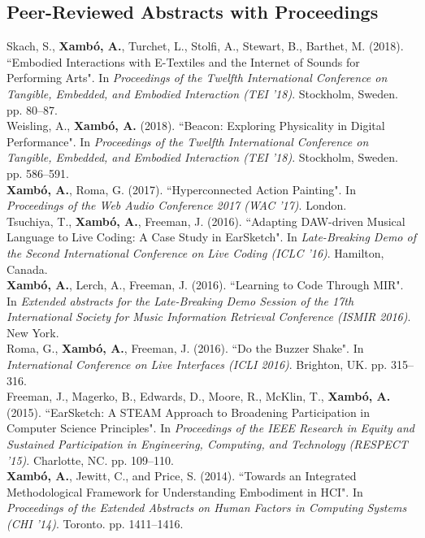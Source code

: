 \documentclass[10pt, a4paper]{article}
\newcommand{\years}[1]{\marginnote{\scriptsize #1}}
\begin{document}
\subsection*{Peer-Reviewed Abstracts with Proceedings}
\noindent
\years{2018b}Skach, S., \textbf{Xambó, A.}, Turchet, L., Stolfi, A., Stewart, B., Barthet, M. (2018). “Embodied Interactions with E-Textiles and the Internet of Sounds for Performing Arts". In \emph{Proceedings of the Twelfth International Conference on Tangible, Embedded, and Embodied Interaction (TEI '18)}. Stockholm, Sweden. pp. 80--87.\\
\years{2018a}Weisling, A., \textbf{Xambó, A.} (2018). “Beacon: Exploring Physicality in Digital Performance". In \emph{Proceedings of the Twelfth International Conference on Tangible, Embedded, and Embodied Interaction (TEI '18)}. Stockholm, Sweden. pp. 586--591.\\
\years{2017a}\textbf{Xambó, A.}, Roma, G. (2017). “Hyperconnected Action Painting". In \emph{Proceedings of the Web Audio Conference 2017 (WAC '17)}. London.\\
\years{2016c}Tsuchiya, T., \textbf{Xambó, A.}, Freeman, J. (2016). “Adapting DAW-driven Musical Language to Live Coding: A Case Study in EarSketch". In \emph{Late-Breaking Demo of the Second International Conference on Live Coding (ICLC '16)}. Hamilton, Canada.\\ 
\years{2016b}\textbf{Xambó, A.}, Lerch, A., Freeman, J. (2016). “Learning to Code Through MIR". In \emph{Extended abstracts for the Late-Breaking Demo Session of the 17th International Society for Music Information Retrieval Conference (ISMIR 2016)}. New York.\\
\years{2016a}Roma, G., \textbf{Xambó, A.}, Freeman, J. (2016). “Do the Buzzer Shake". In \emph{International Conference on Live Interfaces (ICLI 2016)}. Brighton, UK. pp. 315--316.\\
\years{2015}Freeman, J., Magerko, B., Edwards, D., Moore, R., McKlin, T., \textbf{Xambó, A.} (2015). “EarSketch: A STEAM Approach to Broadening Participation in Computer Science Principles". In \emph{Proceedings of the IEEE Research in Equity and Sustained Participation in Engineering, Computing, and Technology (RESPECT '15)}. Charlotte, NC. pp. 109--110.\\
\years{2014}\textbf{Xambó, A.}, Jewitt, C., and Price, S. (2014). “Towards an Integrated Methodological Framework for Understanding Embodiment in HCI". In \emph{Proceedings of the Extended Abstracts on Human Factors in Computing Systems (CHI '14)}. Toronto. pp. 1411--1416.
\end{document}
